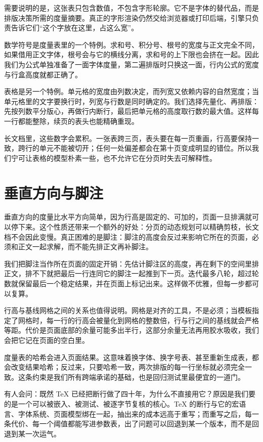 \documentclass{article}
\begin{document}
需要说明的是，这张表只包含数值，不包含字形轮廓。它不是字体的替代品，而是排版决策所需的度量摘要。真正的字形渲染仍然交给浏览器或打印后端，引擎只负责告诉它们“这个字放在这里，占这么宽”。

数学符号是度量表里的一个特例。求和号、积分号、根号的宽度与正文完全不同，如果借用正文字体，根号会与它的横线分离，求和号的上下限也会挤在一起。因此我们为公式单独准备了一面字体度量，第二遍排版时只换这一面，行内公式的宽度与行盒高度就都正确了。

表格是另一个特例。单元格的宽度由列数决定，而列宽又依赖内容的自然宽度；当单元格里的文字要换行时，列宽与行数是同时确定的。我们选择先量化、再排版：先按列数平分版心，再做行内断行，最后把单元格的高度取行数的最大值。这样每一行都能整除，续页的表头也能精确重现。

长文档里，这些数字会累积。一张表跨三页，表头要在每一页重画，行高要保持一致，跨行的单元不能被切开；任何一处偏差都会在第十页变成明显的错位。所以我们宁可让表格的模型朴素一些，也不允许它在分页时失去可解释性。

\section{垂直方向与脚注}

垂直方向的度量比水平方向简单，因为行高是固定的、可加的，页面一旦排满就可以停下来。这个性质还带来一个额外的好处：分页的动态规划可以精确剪枝，长文档不会因此变慢。真正困难的是脚注：脚注的高度会反过来影响它所在的页面，必须和正文一起求解，而不能先排正文再补脚注。

我们把脚注当作所在页面的固定开销：先估计脚注区的高度，再在剩下的空间里排正文，排不下就把最后一行连同它的脚注一起推到下一页。迭代最多八轮，超过轮数就保留最后一个稳定结果，并在页面上标记出来。这样做不优雅，但每一步都可以复算。

行高与基线网格之间的关系也值得说明。网格是对齐的工具，不是必须；当模板指定了网格时，每一行的行高会被量化到网格的整数倍，行与行之间的基线就会严格等距。代价是页面底部的余量可能多出半行，这部分余量无法再用胶水吸收，我们会把它记在页面的空白里。

度量表的哈希会进入页面结果。这意味着换字体、换字号表、甚至重新生成表，都会改变结果哈希；反过来，只要哈希一致，两次排版的每一行坐标就必须完全一致。这条约束是我们所有跨端承诺的基础，也是回归测试里最便宜的一道门。

有人会问：既然 TeX 已经把断行做了四十年，为什么不直接用它？原因是我们要的是一个可以被嵌入、被测试、被逐字节复核的核心。TeX 的断行与它的宏语言、字体系统、页面模型绑在一起，抽出来的成本远高于重写；而重写之后，每一条代价、每一个阈值都能写进参数表，出了问题可以回退到某一个版本，而不是回退到某一次运气。
\end{document}
